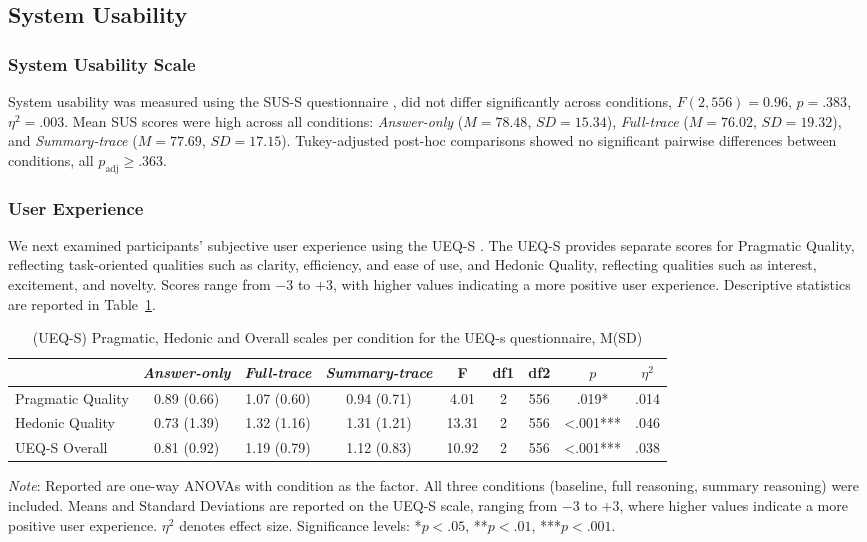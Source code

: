 \documentclass[acmlarge,review=true, anonymous=true]{acmart}
\begin{document}
\subsection{System Usability}

\subsubsection{System Usability Scale} System usability was measured using the SUS-S questionnaire \cite{}, did not differ significantly across conditions, $F(2, 556) = 0.96$, $p = .383$, $\eta^2 = .003$. Mean SUS scores were high across all conditions: \textit{Answer-only} ($M = 78.48$, $SD = 15.34$), \textit{Full-trace} ($M = 76.02$, $SD = 19.32$), and \textit{Summary-trace} ($M = 77.69$, $SD = 17.15$). Tukey-adjusted post-hoc comparisons showed no significant pairwise differences between conditions, all $p_{\mathrm{adj}} \geq .363$.

\subsubsection{User Experience}
We next examined participants' subjective user experience using the UEQ-S \cite{}. The UEQ-S provides separate scores for Pragmatic Quality, reflecting task-oriented qualities such as clarity, efficiency, and ease of use, and Hedonic Quality, reflecting qualities such as interest, excitement, and novelty. Scores range from $-3$ to $+3$, with higher values indicating a more positive user experience. Descriptive statistics are reported in Table~\ref{tab:ueqs}.

\begin{table}[H]
\centering
\caption{(UEQ-S) Pragmatic, Hedonic and Overall scales per condition for the UEQ-s questionnaire, M(SD)}
\begin{tabular}{lcccccccc}
\hline
                  & \textit{Answer-only}    & \textit{Full-trace}   & \textit{Summary-trace}   & F & df1 & df2 & $p$     & $\eta^2$ \\ \hline
Pragmatic Quality & 0.89 (0.66) & 1.07 (0.60) & 0.94 (0.71) & 4.01 & 2& 556 & .019* & .014 \\
Hedonic Quality   & 0.73 (1.39) & 1.32 (1.16) & 1.31 (1.21) & 13.31 & 2& 556& <.001*** & .046 \\
UEQ-S Overall     & 0.81 (0.92) & 1.19 (0.79) & 1.12 (0.83)& 10.92 &2&556&<.001*** & .038 \\  
\hline
\end{tabular}

\raggedright \small \textit{Note}: Reported are one-way ANOVAs with condition as the factor. All three conditions (baseline, full reasoning, summary reasoning) were included. Means and Standard Deviations are reported on the UEQ-S scale, ranging from $-3$ to $+3$, where higher values indicate a more positive user experience. $\eta^2$ denotes effect size.  Significance levels: *$p < .05$, **$p < .01$, ***$p < .001$.
\label{tab:ueqs}
\end{table}
\end{document}
